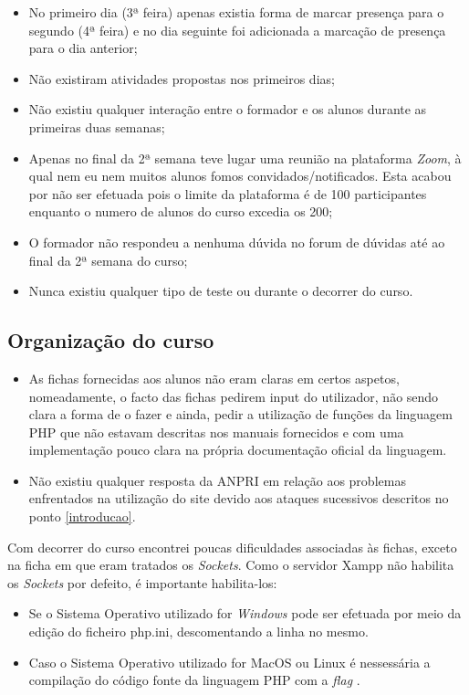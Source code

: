 \documentclass[14pt]{article}
\begin{document}
\begin{itemize}
  \item No primeiro dia (3ª feira) apenas existia forma de marcar presença para o segundo (4ª feira) e no dia seguinte foi adicionada a marcação de presença para o dia anterior;
  \item Não existiram atividades propostas nos primeiros dias;
  \item Não existiu qualquer interação entre o formador e os alunos durante as primeiras duas semanas;
  \item Apenas no final da 2ª semana teve lugar uma reunião na plataforma \textit{Zoom}, à qual nem eu nem muitos alunos fomos convidados/notificados. Esta acabou por não ser efetuada pois o limite da plataforma é de 100 participantes enquanto o numero de alunos do curso excedia os 200;
  \item O formador não respondeu a nenhuma dúvida no forum de dúvidas até ao final da 2ª semana do curso;
  \item Nunca existiu qualquer tipo de teste ou  durante o decorrer do curso.
\end{itemize}
\newline
\subsection{Organização do curso}
\begin{itemize}
  \item As fichas fornecidas aos alunos não eram claras em certos aspetos, nomeadamente, o facto das fichas pedirem input do utilizador, não sendo clara a forma de o fazer e ainda, pedir a utilização de funções da linguagem PHP que não estavam descritas nos manuais fornecidos e com uma implementação pouco clara na própria documentação oficial da linguagem.
  \item Não existiu qualquer resposta da ANPRI em relação aos problemas enfrentados na utilização do site devido aos ataques sucessivos descritos no ponto \large\ref{introducao}.
\end{itemize}

Com decorrer do curso encontrei poucas dificuldades associadas às fichas, exceto na ficha em que eram tratados os \textit{Sockets}.
Como o servidor Xampp não habilita os \textit{Sockets} por defeito, é importante habilita-los:
\begin{itemize}
  \item Se o Sistema Operativo utilizado for \textit{Windows} pode ser efetuada por meio da edição do ficheiro php.ini, descomentando a linha \textit{}  no mesmo.
  \item Caso o Sistema Operativo utilizado for MacOS ou Linux é nessessária a compilação do código fonte da linguagem PHP com a \textit{flag} \textit{}.
\end{itemize}
\end{document}
